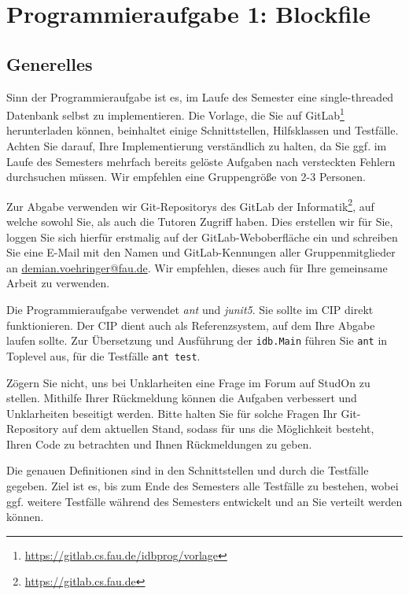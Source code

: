 \section{Programmieraufgabe 1: Blockfile}

\subsection{Generelles}
Sinn der Programmieraufgabe ist es, im Laufe des Semester eine single-threaded Datenbank selbst zu implementieren.
Die Vorlage, die Sie auf GitLab\footnote{\url{https://gitlab.cs.fau.de/idbprog/vorlage}} herunterladen können, beinhaltet einige Schnittstellen, Hilfsklassen und Testfälle.
Achten Sie darauf, Ihre Implementierung verständlich zu halten, da Sie ggf. im Laufe des Semesters mehrfach bereits gelöste Aufgaben nach versteckten Fehlern durchsuchen müssen.
Wir empfehlen eine Gruppengröße von 2-3 Personen.

Zur Abgabe verwenden wir Git-Repositorys des GitLab der Informatik\footnote{\url{https://gitlab.cs.fau.de}}, auf welche sowohl Sie, als auch die Tutoren Zugriff haben.
Dies erstellen wir für Sie, loggen Sie sich hierfür erstmalig auf der GitLab-Weboberfläche ein und schreiben Sie eine E-Mail mit den Namen und GitLab-Kennungen aller Gruppenmitglieder an \href{mailto:demian.voehringer@fau.de}{demian.voehringer@fau.de}.
Wir empfehlen, dieses auch für Ihre gemeinsame Arbeit zu verwenden.

Die Programmieraufgabe verwendet \textit{ant} und \textit{junit5}.
Sie sollte im CIP direkt funktionieren.
Der CIP dient auch als Referenzsystem, auf dem Ihre Abgabe laufen sollte. %
Zur Übersetzung und Ausführung der \texttt{idb.Main} führen Sie \texttt{ant} in Toplevel aus, für die Testfälle \texttt{ant test}.

Zögern Sie nicht, uns bei Unklarheiten eine Frage im Forum auf StudOn zu stellen.
Mithilfe Ihrer Rückmeldung können die Aufgaben verbessert und Unklarheiten beseitigt werden.
Bitte halten Sie für solche Fragen Ihr Git-Repository auf dem aktuellen Stand, sodass für uns die Möglichkeit besteht, Ihren Code zu betrachten und Ihnen Rückmeldungen zu geben.

Die genauen Definitionen sind in den Schnittstellen und durch die Testfälle gegeben.
Ziel ist es, bis zum Ende des Semesters alle Testfälle zu bestehen, wobei ggf. weitere Testfälle während des Semesters entwickelt und an Sie verteilt werden können.


